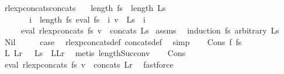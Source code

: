 \begin{isabellebody}
\isamarkupfalse%
\ rlexp{\isacharunderscore}{\kern0pt}concats{\isacharunderscore}{\kern0pt}concats{\isacharcolon}{\kern0pt}\isanewline
\ \ \ {\isachardoublequoteopen}length\ fs\ {\isacharequal}{\kern0pt}\ length\ Ls{\isachardoublequoteclose}\isanewline
\ \ \ \ \ \ \ {\isachardoublequoteopen}{\isasymforall}i\ {\isacharless}{\kern0pt}\ length\ fs{\isachardot}{\kern0pt}\ eval\ {\isacharparenleft}{\kern0pt}fs\ {\isacharbang}{\kern0pt}\ i{\isacharparenright}{\kern0pt}\ v\ {\isacharequal}{\kern0pt}\ Ls\ {\isacharbang}{\kern0pt}\ i{\isachardoublequoteclose}\isanewline
\ \ \ \ \ {\isachardoublequoteopen}eval\ {\isacharparenleft}{\kern0pt}rlexp{\isacharunderscore}{\kern0pt}concats\ fs{\isacharparenright}{\kern0pt}\ v\ {\isacharequal}{\kern0pt}\ concats\ Ls{\isachardoublequoteclose}\isanewline
%
\isadelimproof
%
\endisadelimproof
%
\isatagproof
{}\isamarkupfalse%
\ assms\ \isamarkupfalse%
\ {\isacharparenleft}{\kern0pt}induction\ fs\ arbitrary{\isacharcolon}{\kern0pt}\ Ls{\isacharparenright}{\kern0pt}\isanewline
\ \ \isamarkupfalse%
\ Nil\isanewline
\ \ \isamarkupfalse%
\ \isamarkupfalse%
\ {\isacharquery}{\kern0pt}case\ \isamarkupfalse%
\ rlexp{\isacharunderscore}{\kern0pt}concats{\isacharunderscore}{\kern0pt}def\ concats{\isacharunderscore}{\kern0pt}def\ \isamarkupfalse%
\ simp\isanewline
{}\isamarkupfalse%
\isanewline
\ \ \isamarkupfalse%
\ {\isacharparenleft}{\kern0pt}Cons\ f{}\ fs{\isacharparenright}{\kern0pt}\isanewline
\ \ \isamarkupfalse%
\ \isamarkupfalse%
\ L{}\ Lr\ \ {\isacharasterisk}{\kern0pt}{\isacharcolon}{\kern0pt}\ {\isachardoublequoteopen}Ls\ {\isacharequal}{\kern0pt}\ L{}{\isacharhash}{\kern0pt}Lr{\isachardoublequoteclose}\ \isamarkupfalse%
\ {\isacharparenleft}{\kern0pt}metis\ length{\isacharunderscore}{\kern0pt}Suc{\isacharunderscore}{\kern0pt}conv{\isacharparenright}{\kern0pt}\isanewline
\ \ \isamarkupfalse%
\ Cons\ \isamarkupfalse%
\ {\isachardoublequoteopen}eval\ {\isacharparenleft}{\kern0pt}rlexp{\isacharunderscore}{\kern0pt}concats\ fs{\isacharparenright}{\kern0pt}\ v\ {\isacharequal}{\kern0pt}\ concats\ Lr{\isachardoublequoteclose}\ \isamarkupfalse%
\ fastforce\isanewline
\ \ \isamarkupfalse%

\end{isabellebody}
